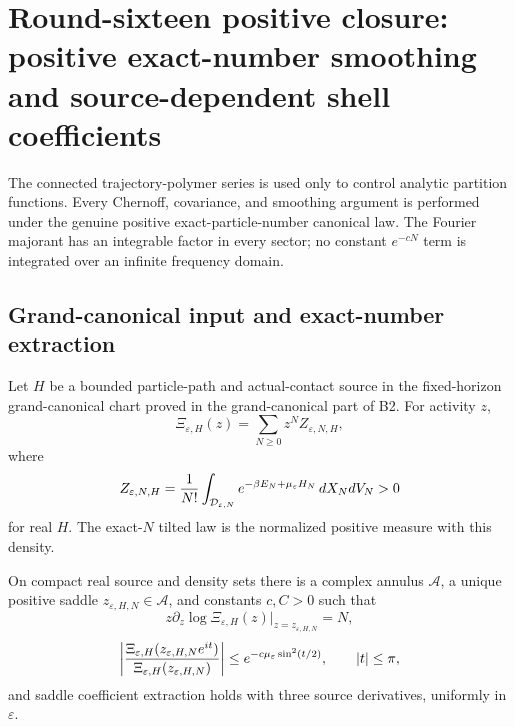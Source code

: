 \section{Round-sixteen positive closure: positive exact-number smoothing and source-dependent shell coefficients}
\label{sec:r16-b1}

The connected trajectory-polymer series is used only to control analytic
partition functions.  Every Chernoff, covariance, and smoothing argument is
performed under the genuine positive exact-particle-number canonical law.
The Fourier majorant has an integrable factor in every sector; no constant
\(e^{-cN}\) term is integrated over an infinite frequency domain.

\subsection{Grand-canonical input and exact-number extraction}

Let \(H\) be a bounded particle-path and actual-contact source in the
fixed-horizon grand-canonical chart proved in the grand-canonical part of B2.
For activity \(z\),
\[
 \Xi_{\varepsilon,H}(z)=
 \sum_{N\ge0}z^N Z_{\varepsilon,N,H},
\]
where
\[
 Z_{\varepsilon,N,H}={1\over N!}
 \int_{\mathcal D_{\varepsilon,N}}
 e^{-\beta E_N+\mu_\varepsilon H_N}\,dX_NdV_N>0
\]
for real \(H\).  The exact-\(N\) tilted law is the normalized positive measure
with this density.

\begin{theorem}
\label{thm:r16-b1-saddle}
On compact real source and density sets there is a complex annulus
\(\mathcal A\), a unique positive saddle \(z_{\varepsilon,H,N}\in\mathcal A\),
and constants \(c,C>0\) such that
\[
 z\partial_z\log\Xi_{\varepsilon,H}(z)
 \big|_{z=z_{\varepsilon,H,N}}=N,
\]
\[
 \left|{
 \Xi_{\varepsilon,H}(z_{\varepsilon,H,N}e^{it})
 \over
 \Xi_{\varepsilon,H}(z_{\varepsilon,H,N})}
 \right|
 \le e^{-c\mu_\varepsilon\sin^2(t/2)},
 \qquad |t|\le\pi,
\]
and saddle coefficient extraction holds with three source derivatives,
uniformly in \(\varepsilon\).
\end{theorem}

